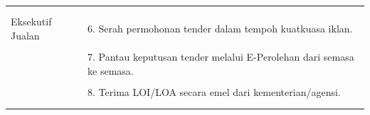 \documentclass[
]{article}
\begin{document}
\begin{longtable}[]{@{}ll@{}}
\begin{minipage}[t]{0.67\columnwidth}
\end{minipage}\tabularnewline
\begin{minipage}[t]{0.27\columnwidth}\raggedright
\strut
\end{minipage} & \begin{minipage}[t]{0.67\columnwidth}\raggedright
\strut
\end{minipage}\tabularnewline
\begin{minipage}[t]{0.27\columnwidth}\raggedright
Eksekutif Jualan\strut
\end{minipage} & \begin{minipage}[t]{0.67\columnwidth}\raggedright
6. Serah permohonan tender dalam tempoh kuatkuasa iklan.\strut
\end{minipage}\tabularnewline
\begin{minipage}[t]{0.27\columnwidth}\raggedright
\strut
\end{minipage} & \begin{minipage}[t]{0.67\columnwidth}\raggedright
\strut
\end{minipage}\tabularnewline
\begin{minipage}[t]{0.27\columnwidth}\raggedright
\strut
\end{minipage} & \begin{minipage}[t]{0.67\columnwidth}\raggedright
7. Pantau keputusan tender melalui E-Perolehan dari semasa ke
semasa.\strut
\end{minipage}\tabularnewline
\begin{minipage}[t]{0.27\columnwidth}\raggedright
\strut
\end{minipage} & \begin{minipage}[t]{0.67\columnwidth}\raggedright
\strut
\end{minipage}\tabularnewline
\begin{minipage}[t]{0.27\columnwidth}\raggedright
\strut
\end{minipage} & \begin{minipage}[t]{0.67\columnwidth}\raggedright
8. Terima LOI/LOA secara emel dari kementerian/agensi.\strut
\end{minipage}\tabularnewline
\begin{minipage}[t]{0.27\columnwidth}\raggedright
\strut
\end{minipage} & \begin{minipage}[t]{0.67\columnwidth}\raggedright
\strut
\end{minipage}\tabularnewline
\begin{minipage}[t]{0.27\columnwidth}\raggedright

\end{minipage}
\end{longtable}
\end{document}
